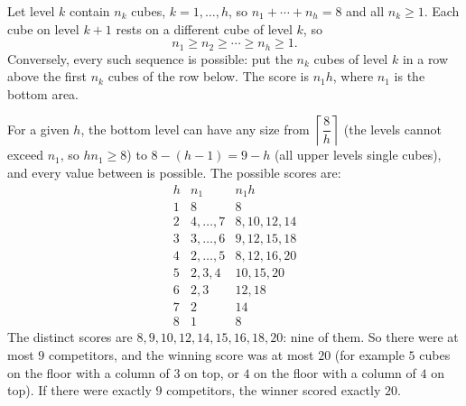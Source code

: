 Let level $k$ contain $n_k$ cubes, $k=1,\dots,h$, so $n_1+\cdots+n_h=8$ and all $n_k\ge1$. Each cube on level $k+1$ rests on a different cube of level $k$, so
\[
n_1\ge n_2\ge\cdots\ge n_h\ge1 .
\]
Conversely, every such sequence is possible: put the $n_k$ cubes of level $k$ in a row above the first $n_k$ cubes of the row below. The score is $n_1h$, where $n_1$ is the bottom area.

For a given $h$, the bottom level can have any size from $\left\lceil\dfrac{8}{h}\right\rceil$ (the levels cannot exceed $n_1$, so $hn_1\ge8$) to $8-(h-1)=9-h$ (all upper levels single cubes), and every value between is possible. The possible scores are:
\[
\begin{array}{c|c|c}
h & n_1 & n_1h\\\hline
1 & 8 & 8\\
2 & 4,\dots,7 & 8,10,12,14\\
3 & 3,\dots,6 & 9,12,15,18\\
4 & 2,\dots,5 & 8,12,16,20\\
5 & 2,3,4 & 10,15,20\\
6 & 2,3 & 12,18\\
7 & 2 & 14\\
8 & 1 & 8
\end{array}
\]
The distinct scores are $8,9,10,12,14,15,16,18,20$: nine of them. So there were at most $\boxed{9}$ competitors, and the winning score was at most $\boxed{20}$ (for example $5$ cubes on the floor with a column of $3$ on top, or $4$ on the floor with a column of $4$ on top). If there were exactly $9$ competitors, the winner scored exactly $20$.
